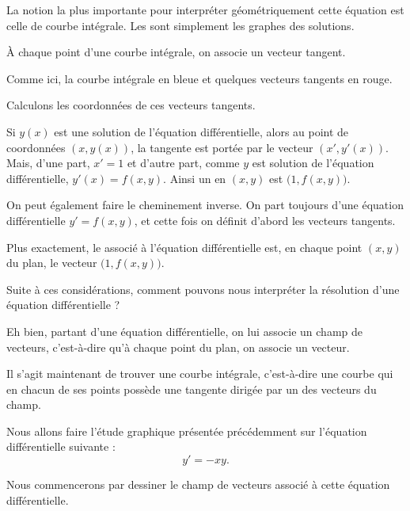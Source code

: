 La notion la plus importante pour interpréter géométriquement cette équation est celle de courbe intégrale. 
Les  
sont simplement les graphes des solutions.


\change
 \`A chaque point d'une courbe intégrale, on associe un vecteur tangent.
 
 
 Comme ici, la courbe intégrale en bleue et quelques vecteurs tangents en rouge.
 
Calculons les coordonnées de ces vecteurs tangents.  
  
Si $y(x)$ est une solution de l'équation différentielle, alors
au point de coordonnées $(x,y(x))$, la tangente est portée par le vecteur $(x',y'(x))$.
Mais, d'une part, $x' = 1$ et d'autre part, comme $y$ est solution de l'équation différentielle,
$y'(x) = f(x,y)$. Ainsi un  en $(x,y)$ est $\big( 1 , f(x,y) \big)$.


\change
On peut également faire le cheminement inverse. On part toujours d'une équation différentielle $y' = f(x,y)$, et cette fois on définit d'abord les vecteurs tangents.

Plus exactement, le   associé à l'équation différentielle est, en chaque point $(x,y)$ du plan, 
le vecteur $\big( 1 , f(x,y) \big)$.


\change
Suite à ces considérations, comment pouvons nous interpréter la résolution d'une équation différentielle ?

Eh bien, partant d'une équation différentielle, on lui associe 
un champ de vecteurs, 
c'est-à-dire qu'à chaque point du plan, on associe un vecteur. 

Il s'agit maintenant de trouver une courbe intégrale,
c'est-à-dire une courbe qui en chacun de ses points possède une tangente dirigée par un des vecteurs du champ.







\diapo 



Nous allons faire l'étude graphique présentée précédemment sur l'équation différentielle suivante : 
  $$y' = -xy.$$
  
  
Nous commencerons par dessiner le champ de vecteurs associé à cette équation différentielle.



